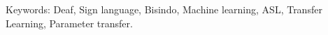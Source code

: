 \lipsum[6-7]

Keywords: Deaf, Sign language, Bisindo, Machine learning, ASL, Transfer Learning, Parameter transfer.